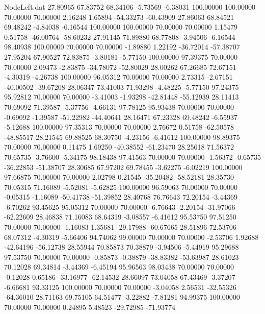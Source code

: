 \begin{filecontents}{NodeLeft.dat}
  27.80965   67.83752   68.34106    -5.73569   -6.38031  100.00000  100.00000   70.00000   70.00000    2.16248    1.65894  -54.33273  -60.43909
  27.86063   68.84521   69.48242    -4.84038   -6.16544  100.00000  100.00000   70.00000   70.00000    1.15479    0.51758  -46.00764  -58.60232
  27.91145   71.89880   68.77808    -3.94506   -6.16544   98.40938  100.00000   70.00000   70.00000   -1.89880    1.22192  -36.72014  -57.38707
  27.95204   67.90527   72.83875    -3.80181   -5.77150  100.00000   97.39375   70.00000   70.00000    2.09473   -2.83875  -34.78072  -52.80029
  28.00262   67.26685   72.67151    -4.30319   -4.26738  100.00000   96.05312   70.00000   70.00000    2.73315   -2.67151  -40.00502  -39.67208
  28.06347   73.41003   71.93298    -4.48225   -5.77150   97.24375   95.92812   70.00000   70.00000   -3.41003   -1.93298  -42.81448  -55.12939
  28.11413   70.69092   71.39587    -5.37756   -4.66131   97.78125   95.93438   70.00000   70.00000   -0.69092   -1.39587  -51.22982  -44.40641
  28.16471   67.23328   69.48242    -6.55937   -5.12688  100.00000   97.35313   70.00000   70.00000    2.76672    0.51758  -62.50578  -48.85517
  28.21545   69.88525   68.30750    -4.23156   -6.41612  100.00000   98.89375   70.00000   70.00000    0.11475    1.69250  -40.38552  -61.23470
  28.25618   71.56372   70.65735    -3.76600   -5.34175   98.18438   97.41563   70.00000   70.00000   -1.56372   -0.65735  -36.22853  -51.38707
  28.30685   67.97202   69.78455    -3.62275   -6.02219  100.00000   97.66875   70.00000   70.00000    2.02798    0.21545  -35.20482  -58.52181
  28.35730   70.05315   71.16089    -5.52081   -5.62825  100.00000   96.59063   70.00000   70.00000   -0.05315   -1.16089  -50.41738  -51.39852
  28.40768   76.76643   72.20154    -3.44369   -6.70262   93.45625   95.05312   70.00000   70.00000   -6.76643   -2.20154  -31.97066  -62.22609
  28.46838   71.16083   68.64319    -3.08557   -6.41612   95.53750   97.51250   70.00000   70.00000   -1.16083    1.35681  -29.17988  -60.67665
  28.51896   72.53706   68.07312    -4.30319   -5.66406   94.74062   99.00000   70.00000   70.00000   -2.53706    1.92688  -42.64196  -56.12738
  28.55944   70.85873   70.38879    -3.94506   -5.44919   95.29688   97.53750   70.00000   70.00000   -0.85873   -0.38879  -38.83382  -53.63987
  28.61023   70.12028   69.34814    -3.44369   -6.45194   95.96563   98.03438   70.00000   70.00000   -0.12028    0.65186  -33.16977  -62.14532
  28.66097   73.04058   67.43469    -3.37207   -6.66681   93.33125  100.00000   70.00000   70.00000   -3.04058    2.56531  -32.55326  -64.36010
  28.71163   69.75105   64.51477    -3.22882   -7.81281   94.99375  100.00000   70.00000   70.00000    0.24895    5.48523  -29.72985  -71.93774

\end{filecontents}
